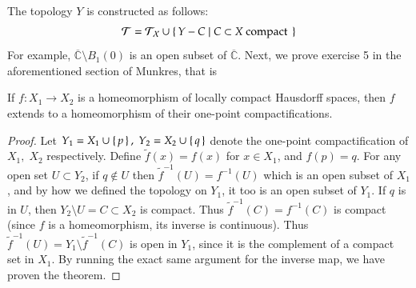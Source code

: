\documentclass[12pt]{article}
\newenvironment{theorem}{\begin{mytheorem}}{\end{mytheorem}}
\theoremstyle{definitionstyle}
\def\mbb#1{\mathbb{#1}}
\def \C{\mbb{C}}
\begin{document}
	The topology $Y$ is constructed as follows:
	\begin{align*}
		\mathcal{T} = \mathcal{T_X} \cup \set{Y - C | C \subset X \text{ compact }}
	\end{align*}
	For example, $\overline{\C} \setminus B_1(0)$ is an open subset of $\overline{\C}$. Next, we prove exercise 5 in the aforementioned section of Munkres, that is
	\begin{theorem}
		If $f: X_1 \to X_2$ is a homeomorphism of locally compact Hausdorff spaces, then $f$ extends to a homeomorphism of their one-point compactifications.
	\end{theorem}
	\begin{proof}
		Let $Y_1 = X_1 \cup \set{p},\; Y_2 = X_2 \cup \set{q}$ denote the one-point compactification of $X_1,\; X_2$ respectively. Define $\tilde{f}(x) = f(x)$ for $x \in X_1$, and $f(p) = q$. For any open set $U \subset Y_2$, if $q \not \in U$ then $\tilde{f}^{-1}(U) = f^{-1}(U)$ which is an open subset of $X_1$, and by how we defined the topology on $Y_1$, it too is an open subset of $Y_1$. If $q$ is in $U$, then $Y_2 \setminus U = C \subset X_2$ is compact. Thus $\tilde{f}^{-1}(C) = f^{-1}(C)$ is compact (since $f$ is a homeomorphism, its inverse is continuous). Thus $\tilde f^{-1}(U) = Y_1 \setminus \tilde f^{-1}(C)$ is open in $Y_1$, since it is the complement of a compact set in $X_1$. By running the exact same argument for the inverse map, we have proven the theorem.
	\end{proof}
\end{document}
